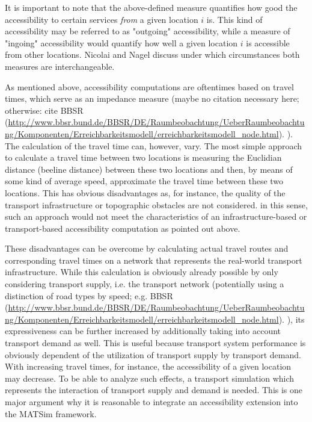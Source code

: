 It is important to note that the above-defined measure quantifies how good the accessibility to certain services \textit{from} a given location $i$ is. This kind of accessibility may be referred to as "outgoing" accessibility, while a measure of "ingoing" accessibility would quantify how well a given location $i$ is accessible from other locations. Nicolai and Nagel \citet{NicolaiNagel2012HiResAccessibilityMethodInBook} discuss under which circumstances both measures are interchangeable.

As mentioned above, accessibility computations are oftentimes based on travel times, which serve as an impedance measure (maybe no citation necessary here; otherwise: cite BBSR (\url{http://www.bbsr.bund.de/BBSR/DE/Raumbeobachtung/UeberRaumbeobachtung/Komponenten/Erreichbarkeitsmodell/erreichbarkeitsmodell_node.html}). ). The calculation of the travel time can, however, vary. The most simple approach to calculate a travel time between two locations is measuring the Euclidian distance (beeline distance) between these two locations and then, by means of some kind of average speed, approximate the travel time between these two locations. This has obvious disadvantages as, for instance, the quality of the transport infrastructure or topographic obstacles are not considered. in this sense, such an approach would not meet the characteristics of an {in\-fra\-struc\-ture-based} or transport-based accessibility computation as pointed out above.

These disadvantages can be overcome by calculating actual travel routes and corresponding travel times on a network that represents the real-world transport infrastructure. While this calculation is obviously already possible by only considering transport supply, i.e. the transport network (potentially using a distinction of road types by speed; e.g. BBSR (\url{http://www.bbsr.bund.de/BBSR/DE/Raumbeobachtung/UeberRaumbeobachtung/Komponenten/Erreichbarkeitsmodell/erreichbarkeitsmodell_node.html}). ), its expressiveness can be further increased by additionally taking into account transport demand as well. This is useful because transport system performance is obviously dependent of the utilization of transport supply by transport demand. With increasing travel times, for instance, the accessibility of a given location may decrease. To be able to analyze such effects, a transport simulation which represents the interaction of transport supply and demand is needed. This is one major argument why it is reasonable to integrate an accessibility extension into the MATSim framework.

